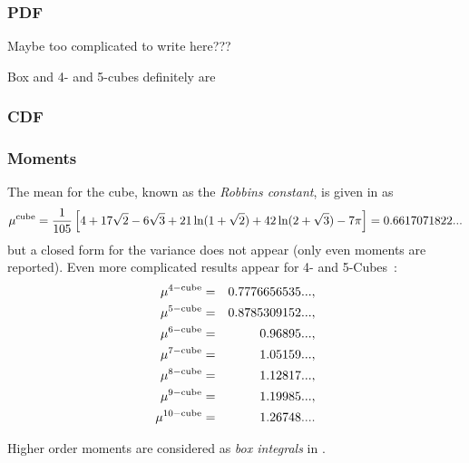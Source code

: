 \subsubsection{PDF}

Maybe too complicated to write here???

Box and 4- and 5-cubes definitely are


\subsubsection{CDF}


\subsubsection{Moments}

The mean for the cube, known as the {\em Robbins constant}, is given
in \cite{robbins78:_constant,weisstein:_cube_line_picking,Bailey2007196} as
\begin{equation}
   \label{eq:cube_mean}
 \mu^{\rm cube} = \frac{1}{105} \left[ 
                             4 + 17 \sqrt{2}- 6 \sqrt{3}  +
                             21 \ln(1+\sqrt{2}) + 
                             42 \ln(2+\sqrt{3}) - 7 \pi
                      \right]
	= 0.6617071822...
\end{equation}
but a closed form for the variance does not appear (only even moments
are reported). Even more complicated results appear for 4- and
5-Cubes~\cite{anderssen76:_concer,philip:_probab_distr_distan_between_two_4d,Bailey2007196}:
\begin{eqnarray}
 \mu^{\rm 4-cube}  & = & 0.7776656535 ...    \label{eq:4-cube-mean}, \\
 \mu^{\rm 5-cube}  & = & 0.8785309152 ...     \label{eq:5-cube-mean}, \\
 \mu^{\rm 6-cube}  & = & 0.96895 ...     \label{eq:6-cube-mean}, \\
 \mu^{\rm 7-cube}  & = & 1.05159 ...     \label{eq:7-cube-mean}, \\
 \mu^{\rm 8-cube}  & = & 1.12817 ...     \label{eq:8-cube-mean}, \\
 \mu^{\rm 9-cube}  & = & 1.19985 ...     \label{eq:9-cube-mean}, \\
 \mu^{\rm 10-cube} & = & 1.26748 ...     \label{eq:10-cube-mean}.
\end{eqnarray}

Higher order moments are considered as {\em box integrals} in
\cite{Bailey2007196}. 

